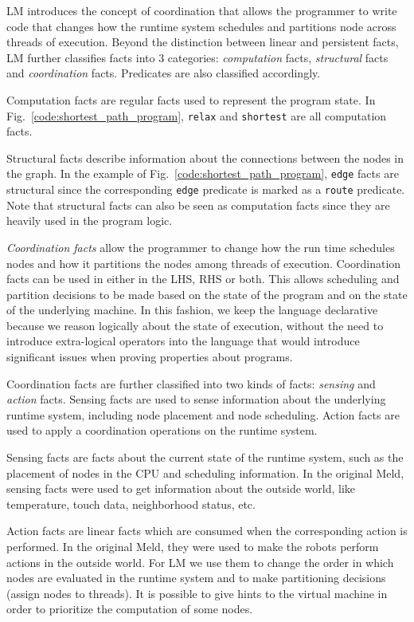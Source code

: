 LM introduces the concept of coordination that allows the programmer to write
code that changes how the runtime system schedules and partitions node across
threads of execution. Beyond the distinction between linear and persistent
facts, LM further classifies facts into 3 categories: \emph{computation} facts,
\emph{structural} facts and \emph{coordination} facts.
Predicates are also classified accordingly.

Computation facts are regular facts used to represent the program state. In
Fig.~\ref{code:shortest_path_program}, \texttt{relax} and \texttt{shortest} are
all computation facts.

Structural facts describe information about the connections between the nodes in
the graph.  In the example of Fig.~\ref{code:shortest_path_program},
\texttt{edge} facts are structural since the corresponding \texttt{edge}
predicate is marked as a \texttt{route} predicate. Note that structural facts
can also be seen as computation facts since they are heavily used in the program
logic.

\emph{Coordination facts} allow the programmer to change how the run time
schedules nodes and how it partitions the nodes among threads of execution.
Coordination facts can be used in either in the LHS, RHS or both.  This allows
scheduling and partition decisions to be made based on the state of the program
and on the state of the underlying machine.  In this fashion, we keep the
language declarative because we reason logically about the state of execution,
without the need to introduce extra-logical operators into the language that
would introduce significant issues when proving properties about programs.

Coordination facts are further classified into two kinds of facts:
\emph{sensing} and \emph{action} facts. Sensing facts are used to sense
information about the underlying runtime system, including node placement and
node scheduling.  Action facts are used to apply a coordination operations on
the runtime system.


Sensing facts are facts about the current state of the runtime system, such as
the placement of nodes in the CPU and scheduling information. In the original
Meld, sensing facts were used to get information about the outside world, like
temperature, touch data, neighborhood status, etc.

Action facts are linear facts which are consumed when the corresponding action
is performed. In the original Meld, they were used to make the robots perform
actions in the outside world.  For LM we use them to change the order in which
nodes are evaluated in the runtime system and to make partitioning decisions
(assign nodes to threads). It is possible to give hints to the virtual machine
in order to prioritize the computation of some nodes.

